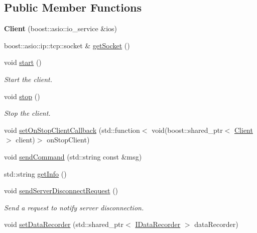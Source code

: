 \subsection*{Public Member Functions}
\begin{DoxyCompactItemize}
\item 
\mbox{\label{classts_1_1_client_a892b1cd679659a7b35dc2da44938e509}} 
{\bfseries Client} (boost\+::asio\+::io\+\_\+service \&ios)
\item 
boost\+::asio\+::ip\+::tcp\+::socket \& \hyperlink{classts_1_1_client_a02aaec358cb00665465e5ebb0e031ea2}{get\+Socket} ()
\item 
\mbox{\label{classts_1_1_client_a5f37c3c03162add1fcf084cd10bf4d78}} 
void \hyperlink{classts_1_1_client_a5f37c3c03162add1fcf084cd10bf4d78}{start} ()
\begin{DoxyCompactList}\small\item\em Start the client. \end{DoxyCompactList}\item 
\mbox{\label{classts_1_1_client_aec10dc278b3e8ede97beee9ef4393076}} 
void \hyperlink{classts_1_1_client_aec10dc278b3e8ede97beee9ef4393076}{stop} ()
\begin{DoxyCompactList}\small\item\em Stop the client. \end{DoxyCompactList}\item 
void \hyperlink{classts_1_1_client_a524c5585285a81de781fc7e1d1cd3a16}{set\+On\+Stop\+Client\+Callback} (std\+::function$<$ void(boost\+::shared\+\_\+ptr$<$ \hyperlink{classts_1_1_client}{Client} $>$ client)$>$ on\+Stop\+Client)
\item 
void \hyperlink{classts_1_1_client_a60a5793486ab652d476b930dc432884a}{send\+Command} (std\+::string const \&msg)
\item 
std\+::string \hyperlink{classts_1_1_client_a76240db1ee8a0c56be0e7b88e3f7e52e}{get\+Info} ()
\item 
\mbox{\label{classts_1_1_client_a3f8170f3d749c048125dc9aaf312c7bf}} 
void \hyperlink{classts_1_1_client_a3f8170f3d749c048125dc9aaf312c7bf}{send\+Server\+Disconnect\+Request} ()
\begin{DoxyCompactList}\small\item\em Send a request to notify server disconnection. \end{DoxyCompactList}\item 
void \hyperlink{classts_1_1_client_a4fd19e3b8dae284cd0f30bf7bd525720}{set\+Data\+Recorder} (std\+::shared\+\_\+ptr$<$ \hyperlink{classts_1_1_i_data_recorder}{I\+Data\+Recorder} $>$ data\+Recorder)
\end{DoxyCompactItemize}
